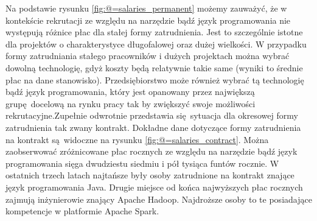 \newline Na podstawie rysunku \ref{fig:@=salaries_permanent} możemy zauważyć, że w kontekście rekrutacji ze względu na narzędzie bądź język programowania nie występują różnice płac dla stałej formy zatrudnienia. Jest to szczególnie istotne dla projektów o charakterystyce długofalowej oraz dużej wielkości. W przypadku formy zatrudniania stałego pracowników i dużych projektach można wybrać dowolną technologię, gdyż koszty będą relatywnie takie same (wyniki to średnie płac na dane stanowisko). Przedsiębiorstwo może również wybrać tą technologię bądź język programowania, który jest opanowany przez największą grupę docelową na rynku pracy tak by zwiększyć swoje możliwości rekrutacyjne.\newline Zupełnie odwrotnie przedstawia się sytuacja dla okresowej formy zatrudnienia tak zwany kontrakt. Dokładne dane dotyczące formy zatrudnienia na kontrakt są widoczne na rysunku \ref{fig:@=salaries_contract}. Można zaobserwować zróżnicowane płac rocznych ze względu na narzędzie bądź język programowania sięga dwudziestu siedmiu i pół tysiąca funtów rocznie. W ostatnich trzech latach najtańsze były osoby zatrudnione na kontrakt znające język programowania Java. Drugie miejsce od końca najwyższych płac rocznych zajmują inżynierowie znający Apache Hadoop. Najdroższe osoby to te posiadające kompetencje w platformie Apache Spark. 